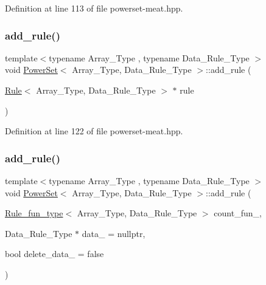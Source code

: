 Definition at line 113 of file powerset-\/meat.\+hpp.

\mbox{\label{class_power_set_a6cb8fb8f09b4c190e2ac6c07daa1241e}} 
\subsubsection{\texorpdfstring{add\+\_\+rule()}{add\_rule()}\hspace{0.1cm}{\footnotesize\ttfamily [2/3]}}
{\footnotesize\ttfamily template$<$typename Array\+\_\+\+Type , typename Data\+\_\+\+Rule\+\_\+\+Type $>$ \\
void \hyperlink{class_power_set}{Power\+Set}$<$ Array\+\_\+\+Type, Data\+\_\+\+Rule\+\_\+\+Type $>$\+::add\+\_\+rule (\begin{DoxyParamCaption}\item[{\hyperlink{class_rule}{Rule}$<$ Array\+\_\+\+Type, Data\+\_\+\+Rule\+\_\+\+Type $>$ $\ast$}]{rule }\end{DoxyParamCaption})\hspace{0.3cm}{\ttfamily [inline]}}



Definition at line 122 of file powerset-\/meat.\+hpp.

\mbox{\label{class_power_set_aae5eae12186fff037efa3884ac2b3dcc}} 
\subsubsection{\texorpdfstring{add\+\_\+rule()}{add\_rule()}\hspace{0.1cm}{\footnotesize\ttfamily [3/3]}}
{\footnotesize\ttfamily template$<$typename Array\+\_\+\+Type , typename Data\+\_\+\+Rule\+\_\+\+Type $>$ \\
void \hyperlink{class_power_set}{Power\+Set}$<$ Array\+\_\+\+Type, Data\+\_\+\+Rule\+\_\+\+Type $>$\+::add\+\_\+rule (\begin{DoxyParamCaption}\item[{\hyperlink{typedefs_8hpp_a99982bdca40c23ca6f901c8e66da78a1}{Rule\+\_\+fun\+\_\+type}$<$ Array\+\_\+\+Type, Data\+\_\+\+Rule\+\_\+\+Type $>$}]{count\+\_\+fun\+\_\+,  }\item[{Data\+\_\+\+Rule\+\_\+\+Type $\ast$}]{data\+\_\+ = {\ttfamily nullptr},  }\item[{bool}]{delete\+\_\+data\+\_\+ = {\ttfamily false} }\end{DoxyParamCaption})\hspace{0.3cm}{\ttfamily [inline]}}



